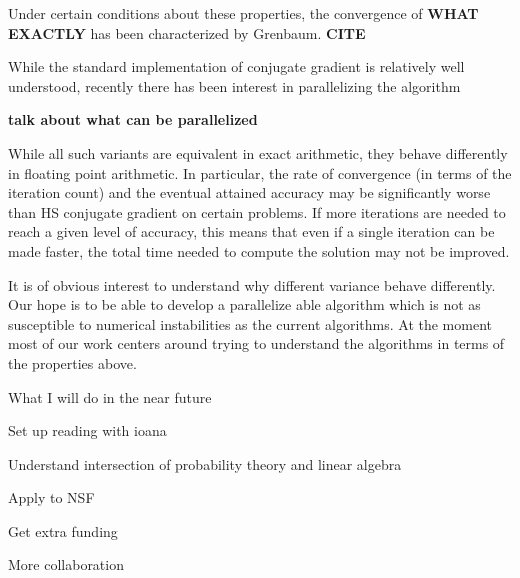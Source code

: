 \documentclass[12pt]{article}
\begin{document}
Under certain conditions about these properties, the convergence of \textbf{WHAT EXACTLY} has been characterized by Grenbaum. \textbf{CITE}

While the standard implementation of conjugate gradient is relatively well understood, recently there has been interest in parallelizing the algorithm

\textbf{talk about what can be parallelized}

While all such variants are equivalent in exact arithmetic, they behave differently in floating point arithmetic. In particular, the rate of convergence (in terms of the iteration count) and the eventual attained accuracy may be significantly worse than HS conjugate gradient on certain problems. If more iterations are needed to reach a given level of accuracy, this means that even if a single iteration can be made faster, the total time needed to compute the solution may not be improved. 

It is of obvious interest to understand why different variance behave differently. Our hope is to be able to develop a parallelize able algorithm which is not as susceptible to numerical instabilities as the current algorithms. At the moment most of our work centers around trying to understand the algorithms in terms of the properties above. 




What I will do in the near future

Set up reading with ioana

Understand intersection of probability theory and linear algebra

Apply to NSF

Get extra funding

More collaboration
\end{document}
